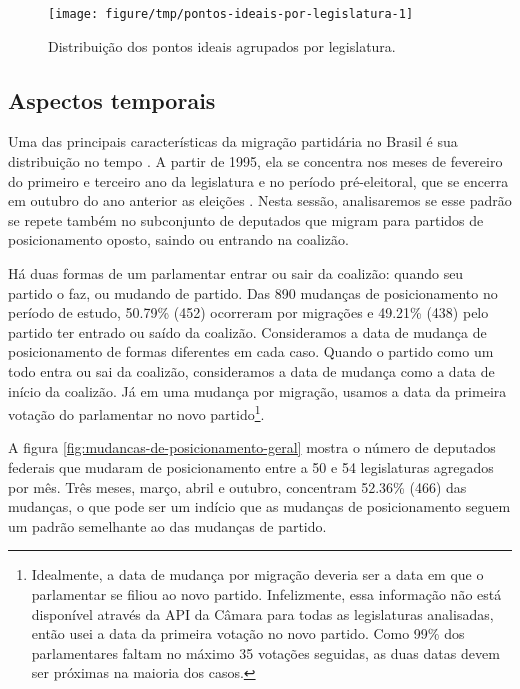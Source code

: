 \documentclass[a4paper,titlepage]{ppgi}\usepackage[]{graphicx}\usepackage[]{color}
\newenvironment{knitrout}{}{} %
\begin{document}
\begin{knitrout}
\color{fgcolor}\begin{figure}
\texttt{[image: figure/tmp/pontos-ideais-por-legislatura-1]} \caption[Distribuição dos pontos ideais agrupados por legislatura]{Distribuição dos pontos ideais agrupados por legislatura.}\label{fig:pontos-ideais-por-legislatura}
\end{figure}


\end{knitrout}

\subsection{Aspectos temporais}
\label{sec:miolo:aspectos-temporais}



Uma das principais características da migração partidária no Brasil é sua
distribuição no tempo \cite{Araujo2000,Melo2004,Freitas2008}. A partir de 1995,
ela se concentra nos meses de fevereiro do primeiro e terceiro ano da
legislatura e no período pré-eleitoral, que se encerra em outubro do ano
anterior as eleições \cite{Freitas2008,Lei9504/1997}. Nesta sessão,
analisaremos se esse padrão se repete também no subconjunto de deputados que
migram para partidos de posicionamento oposto, saindo ou entrando na coalizão.

Há duas formas de um parlamentar entrar ou sair da coalizão: quando seu partido
o faz, ou mudando de partido. Das 890 mudanças de
posicionamento no período de estudo,
50.79\% (452)
ocorreram por migrações e
49.21\% (438)
pelo partido ter entrado ou saído da coalizão. Consideramos a data de mudança
de posicionamento de formas diferentes em cada caso. Quando o partido como um
todo entra ou sai da coalizão, consideramos a data de mudança como a data de
início da coalizão. Já em uma mudança por migração, usamos a data da primeira
votação do parlamentar no novo partido\footnote{Idealmente, a data de mudança
por migração deveria ser a data em que o parlamentar se filiou ao novo partido.
Infelizmente, essa informação não está disponível através da \gls{API} da
Câmara para todas as legislaturas analisadas, então usei a data da primeira
votação no novo partido. Como 99\% dos parlamentares faltam no máximo 35
votações seguidas, as duas datas devem ser próximas na maioria dos casos.}.

A figura \ref{fig:mudancas-de-posicionamento-geral} mostra o número de
deputados federais que mudaram de posicionamento entre a 50\textordfeminine{} e
54\textordfeminine{} legislaturas agregados por mês. Três meses, março, abril e
outubro, concentram
52.36\%
(466) das mudanças, o que pode
ser um indício que as mudanças de posicionamento seguem um padrão semelhante ao
das mudanças de partido.
\end{document}
